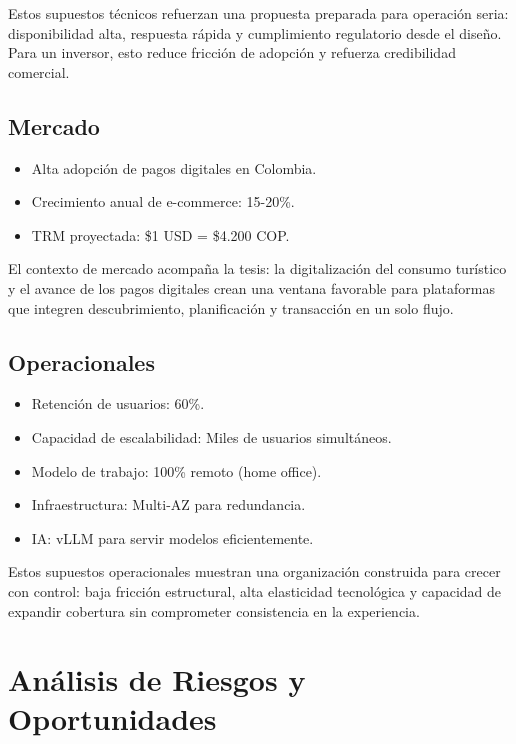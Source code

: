 \documentclass[12pt]{article}
\begin{document}
Estos supuestos técnicos refuerzan una propuesta preparada para operación seria: disponibilidad alta, respuesta rápida y cumplimiento regulatorio desde el diseño. Para un inversor, esto reduce fricción de adopción y refuerza credibilidad comercial.

\subsection{Mercado}

\begin{itemize}
    \item Alta adopción de pagos digitales en Colombia.
    \item Crecimiento anual de e-commerce: 15-20\%.
    \item TRM proyectada: \$1 USD = \$4.200 COP.
\end{itemize}

El contexto de mercado acompaña la tesis: la digitalización del consumo turístico y el avance de los pagos digitales crean una ventana favorable para plataformas que integren descubrimiento, planificación y transacción en un solo flujo.

\subsection{Operacionales}

\begin{itemize}
    \item Retención de usuarios: 60\%.
    \item Capacidad de escalabilidad: Miles de usuarios simultáneos.
    \item Modelo de trabajo: 100\% remoto (home office).
    \item Infraestructura: Multi-AZ para redundancia.
    \item IA: vLLM para servir modelos eficientemente.
\end{itemize}

Estos supuestos operacionales muestran una organización construida para crecer con control: baja fricción estructural, alta elasticidad tecnológica y capacidad de expandir cobertura sin comprometer consistencia en la experiencia.

\section{Análisis de Riesgos y Oportunidades}
\end{document}
